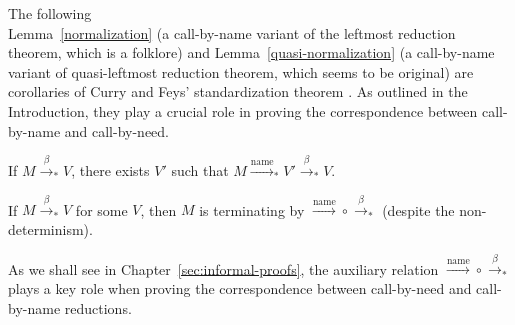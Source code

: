 \documentclass[english]{sumiilab-paper}
\newcommand{\FULLBETA}{\xrightarrow{\beta}}
\newcommand{\CALLBYNAME}{\xrightarrow{\mathrm{name}}}
\newcommand{\RTCLOS}[1]{#1_*}
\newcommand{\lemmaname}{Lemma}
\begin{document}
The following\\\lemmaname~\ref{normalization} (a call-by-name variant of the leftmost reduction theorem, which is a folklore) and \lemmaname~\ref{quasi-normalization} (a call-by-name variant of quasi-leftmost reduction theorem, which seems to be original) are corollaries of Curry and Feys' standardization theorem \cite{Barendregt-84}.
As outlined in the Introduction, they play a crucial role in proving the correspondence between call-by-name and call-by-need.
%
\begin{lemma}\label{normalization}
	If $M\RTCLOS{\FULLBETA}V$, there exists $V'$ such that $M\RTCLOS{\CALLBYNAME}V' \RTCLOS{\FULLBETA} V$.
\end{lemma}
%
\begin{lemma}\label{quasi-normalization}
	If $M \RTCLOS{\FULLBETA} V$ for some $V$, then $M$ is terminating by ${\CALLBYNAME}\circ{\RTCLOS{\FULLBETA}}$ (despite the non-determinism).
\end{lemma}
%
As we shall see in Chapter~\ref{sec:informal-proofs}, the auxiliary relation ${\CALLBYNAME}\circ{\RTCLOS{\FULLBETA}}$ plays a key role when proving the correspondence between call-by-need and call-by-name reductions.
%
\end{document}
